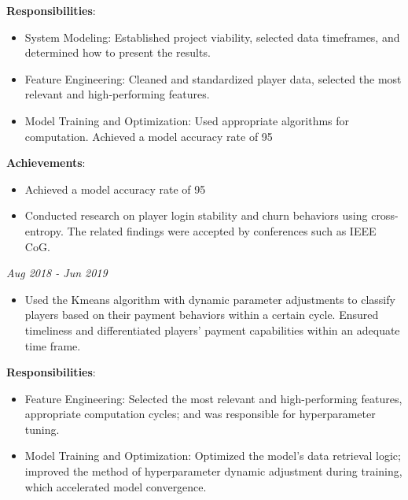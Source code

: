 \documentclass[letterpaper,11pt]{article}
\begin{document}
\textbf{Responsibilities}:
\begin{itemize}
    \item System Modeling: Established project viability, selected data timeframes, and determined how to present the results.
    \item Feature Engineering: Cleaned and standardized player data, selected the most relevant and high-performing features.
    \item Model Training and Optimization: Used appropriate algorithms for computation. Achieved a model accuracy rate of 95%
\end{itemize}

\textbf{Achievements}:
\begin{itemize}
    \item Achieved a model accuracy rate of 95%
    \item Conducted research on player login stability and churn behaviors using cross-entropy. The related findings were accepted by conferences such as IEEE CoG.
\end{itemize}

 \hfill \textit{Aug 2018 - Jun 2019}
\begin{itemize}
    \item Used the Kmeans algorithm with dynamic parameter adjustments to classify players based on their payment behaviors within a certain cycle. Ensured timeliness and differentiated players' payment capabilities within an adequate time frame.
\end{itemize}

\textbf{Responsibilities}:
\begin{itemize}
    \item Feature Engineering: Selected the most relevant and high-performing features, appropriate computation cycles; and was responsible for hyperparameter tuning.
    \item Model Training and Optimization: Optimized the model's data retrieval logic; improved the method of hyperparameter dynamic adjustment during training, which accelerated model convergence.
\end{itemize}
\end{document}
